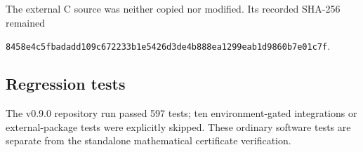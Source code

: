 The external C source was neither copied nor modified.  Its recorded SHA-256
remained
\begin{center}
\scriptsize
\nolinkurl{8458e4c5fbadadd109c672233b1e5426d3de4b888ea1299eab1d9860b7e01c7f}.
\end{center}

\subsection*{Regression tests}

The v0.9.0 repository run passed 597 tests; ten environment-gated integrations
or external-package tests were explicitly skipped.
These ordinary software tests are separate from the standalone mathematical
certificate verification.
